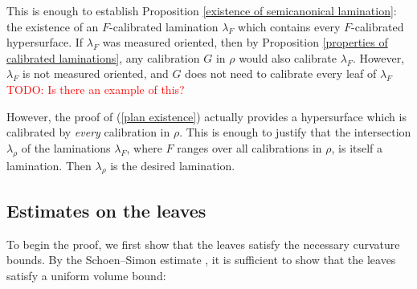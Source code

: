 \documentclass[reqno,11pt]{amsart}
\theoremstyle{definition}
\numberwithin{equation}{section}
\newcommand\todo[1]{\textcolor{red}{TODO: #1}}
\begin{document}
This is enough to establish Proposition \ref{existence of semicanonical lamination}: the existence of an $F$-calibrated lamination $\lambda_F$ which contains every $F$-calibrated hypersurface.
If $\lambda_F$ was measured oriented, then by Proposition \ref{properties of calibrated laminations}, any calibration $G$ in $\rho$ would also calibrate $\lambda_F$.
However, $\lambda_F$ is not measured oriented, and $G$ does not need to calibrate every leaf of $\lambda_F$ \todo{Is there an example of this?}

However, the proof of (\ref{plan existence}) actually provides a hypersurface which is calibrated by \emph{every} calibration in $\rho$.
This is enough to justify that the intersection $\lambda_\rho$ of the laminations $\lambda_F$, where $F$ ranges over all calibrations in $\rho$, is itself a lamination.
Then $\lambda_\rho$ is the desired lamination.

\subsection{Estimates on the leaves}
To begin the proof, we first show that the leaves satisfy the necessary curvature bounds.
By the Schoen--Simon estimate \cite{Schoen81}, it is sufficient to show that the leaves satisfy a uniform volume bound:
\end{document}
